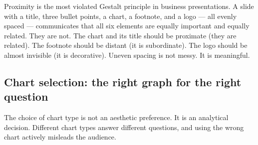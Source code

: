 \vspace{0.5em}

\begin{insightbox}
Proximity is the most violated Gestalt principle in business presentations. A slide with a title, three bullet points, a chart, a footnote, and a logo --- all evenly spaced --- communicates that all six elements are equally important and equally related. They are not. The chart and its title should be proximate (they are related). The footnote should be distant (it is subordinate). The logo should be almost invisible (it is decorative). Uneven spacing is not messy. It is meaningful.
\end{insightbox}


\subsection{Chart selection: the right graph for the right question}

The choice of chart type is not an aesthetic preference. It is an analytical decision. Different chart types answer different questions, and using the wrong chart actively misleads the audience.

